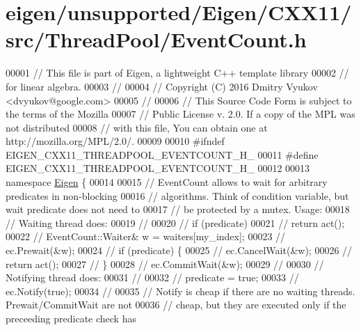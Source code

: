 \hypertarget{eigen_2unsupported_2_eigen_2_c_x_x11_2src_2_thread_pool_2_event_count_8h_source}{}\section{eigen/unsupported/\+Eigen/\+C\+X\+X11/src/\+Thread\+Pool/\+Event\+Count.h}
\label{eigen_2unsupported_2_eigen_2_c_x_x11_2src_2_thread_pool_2_event_count_8h_source}

\begin{DoxyCode}
00001 \textcolor{comment}{// This file is part of Eigen, a lightweight C++ template library}
00002 \textcolor{comment}{// for linear algebra.}
00003 \textcolor{comment}{//}
00004 \textcolor{comment}{// Copyright (C) 2016 Dmitry Vyukov <dvyukov@google.com>}
00005 \textcolor{comment}{//}
00006 \textcolor{comment}{// This Source Code Form is subject to the terms of the Mozilla}
00007 \textcolor{comment}{// Public License v. 2.0. If a copy of the MPL was not distributed}
00008 \textcolor{comment}{// with this file, You can obtain one at http://mozilla.org/MPL/2.0/.}
00009 
00010 \textcolor{preprocessor}{#ifndef EIGEN\_CXX11\_THREADPOOL\_EVENTCOUNT\_H\_}
00011 \textcolor{preprocessor}{#define EIGEN\_CXX11\_THREADPOOL\_EVENTCOUNT\_H\_}
00012 
00013 \textcolor{keyword}{namespace }\hyperlink{namespace_eigen}{Eigen} \{
00014 
00015 \textcolor{comment}{// EventCount allows to wait for arbitrary predicates in non-blocking}
00016 \textcolor{comment}{// algorithms. Think of condition variable, but wait predicate does not need to}
00017 \textcolor{comment}{// be protected by a mutex. Usage:}
00018 \textcolor{comment}{// Waiting thread does:}
00019 \textcolor{comment}{//}
00020 \textcolor{comment}{//   if (predicate)}
00021 \textcolor{comment}{//     return act();}
00022 \textcolor{comment}{//   EventCount::Waiter& w = waiters[my\_index];}
00023 \textcolor{comment}{//   ec.Prewait(&w);}
00024 \textcolor{comment}{//   if (predicate) \{}
00025 \textcolor{comment}{//     ec.CancelWait(&w);}
00026 \textcolor{comment}{//     return act();}
00027 \textcolor{comment}{//   \}}
00028 \textcolor{comment}{//   ec.CommitWait(&w);}
00029 \textcolor{comment}{//}
00030 \textcolor{comment}{// Notifying thread does:}
00031 \textcolor{comment}{//}
00032 \textcolor{comment}{//   predicate = true;}
00033 \textcolor{comment}{//   ec.Notify(true);}
00034 \textcolor{comment}{//}
00035 \textcolor{comment}{// Notify is cheap if there are no waiting threads. Prewait/CommitWait are not}
00036 \textcolor{comment}{// cheap, but they are executed only if the preceeding predicate check has}

\end{DoxyCode}
